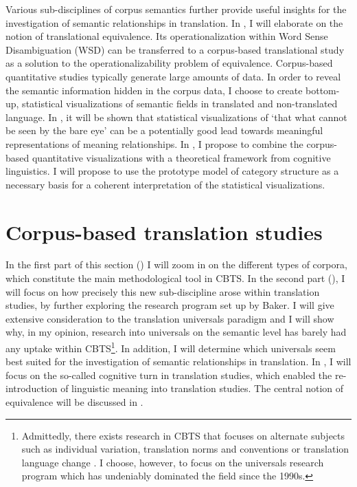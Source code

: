 Various sub-disciplines of corpus semantics further provide useful insights for the investigation of semantic relationships in translation. In , I will elaborate on the notion of translational equivalence. Its operationalization within Word Sense Disambiguation (WSD) can be transferred to a corpus-based translational study as a solution to the operationalizability problem of equivalence. Corpus-based quantitative studies typically generate large amounts of data. In order to reveal the semantic information hidden in the corpus data, I choose to create bottom-up, statistical visualizations of semantic fields in translated and non-translated language. In , it will be shown that statistical visualizations of ‘that what cannot be seen by the bare eye’ can be a potentially good lead towards meaningful representations of meaning relationships. In , I propose to combine the corpus-based quantitative visualizations with a theoretical framework from cognitive linguistics. I will propose to use the prototype model of category structure as a necessary basis for a coherent interpretation of the statistical visualizations.


\section{\label{sec:2.2}  Corpus-based translation studies}

In the first part of this section () I will zoom in on the different types of corpora, which constitute the main methodological tool in CBTS. In the second part (), I will focus on how precisely this new sub-discipline arose within translation studies, by further exploring the research program set up by Baker. I will give extensive consideration to the translation universals paradigm and I will show why, in my opinion, research into universals on the semantic level has barely had any uptake within CBTS\footnote{Admittedly, there exists research in CBTS that focuses on alternate subjects such as individual variation, translation norms and conventions or translation language change \citep[21]{zanettin_corpus_2013}. I choose, however, to focus on the universals research program which has undeniably dominated the field since the 1990s.}. In addition, I will determine which universals seem best suited for the investigation of semantic relationships in translation. In , I will focus on the so-called cognitive turn in translation studies, which enabled the re-introduction of linguistic meaning into translation studies. The central notion of equivalence will be discussed in .\hypertarget{Corpora}{}


